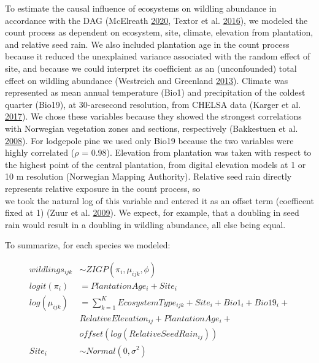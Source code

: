 \documentclass[
]{article}
\begin{document}
To estimate the causal influence of ecosystems on wildling abundance in accordance with the DAG (McElreath \protect\hyperlink{ref-mcelreathHauntedDAGCausal2020}{2020}, Textor et al. \protect\hyperlink{ref-textorRobustCausalInference2016}{2016}), we modeled the count process as dependent on ecosystem, site, climate, elevation from plantation, and relative seed rain.
We also included plantation age in the count process because it reduced the unexplained variance associated with the random effect of site, and because we could interpret its coefficient as an (unconfounded) total effect on wildling abundance (Westreich and Greenland \protect\hyperlink{ref-westreichTableFallacyPresenting2013}{2013}).
Climate was represented as mean annual temperature (Bio1) and precipitation of the coldest quarter (Bio19), at 30-arcsecond resolution, from CHELSA data (Karger et al. \protect\hyperlink{ref-kargerClimatologiesHighResolution2017}{2017}).
We chose these variables because they showed the strongest correlations with Norwegian vegetation zones and sections, respectively (Bakkestuen et al. \protect\hyperlink{ref-bakkestuenSteplessModelsRegional2008}{2008}).
For lodgepole pine we used only Bio19 because the two variables were highly correlated (\(\rho\) = 0.98).
Elevation from plantation was taken with respect to the highest point of the central plantation, from digital elevation models at 1 or 10 m resolution (Norwegian Mapping Authority).
Relative seed rain directly represents relative exposure in the count process, so\\
we took the natural log of this variable and entered it as an offset term (coefficent fixed at 1) (Zuur et al. \protect\hyperlink{ref-zuurMixedEffectsModels2009}{2009}).
We expect, for example, that a doubling in seed rain would result in a doubling in wildling abundance, all else being equal.

To summarize, for each species we modeled:

\begin{equation}
\begin{aligned}
wildlings_{ijk} &\sim ZIGP(\pi_{i}, \mu_{ijk}, \phi) \\
logit(\pi_{i}) &= PlantationAge_{i} + Site_{i} \\
log(\mu_{ijk}) &= \sum\limits_{k=1}^K EcosystemType_{ijk} + Site_{i} + Bio1_{i} + Bio19_{i} + \\
&RelativeElevation_{ij} + PlantationAge_{i} + \\
&offset(log(RelativeSeedRain_{ij})) \\
Site_{i} &\sim Normal(0, \sigma^2) \\
\end{aligned}
\end{equation}
\end{document}
